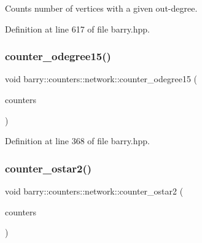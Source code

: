 Counts number of vertices with a given out-\/degree. 



Definition at line 617 of file barry.\+hpp.

\mbox{\label{namespacebarry_1_1counters_1_1network_a7a43854f3227f5f92d3ff580e99c7136}} 
\subsubsection{\texorpdfstring{counter\+\_\+odegree15()}{counter\_odegree15()}}
{\footnotesize\ttfamily void barry\+::counters\+::network\+::counter\+\_\+odegree15 (\begin{DoxyParamCaption}\item[{\hyperlink{namespacebarry_1_1counters_1_1network_a3b3c590303d47840d1967372ae495d95}{Net\+Counter\+Vector} $\ast$}]{counters }\end{DoxyParamCaption})\hspace{0.3cm}{\ttfamily [inline]}}



Definition at line 368 of file barry.\+hpp.

\mbox{\label{namespacebarry_1_1counters_1_1network_af76d9df31e55422bdffdb9e56870a46f}} 
\subsubsection{\texorpdfstring{counter\+\_\+ostar2()}{counter\_ostar2()}}
{\footnotesize\ttfamily void barry\+::counters\+::network\+::counter\+\_\+ostar2 (\begin{DoxyParamCaption}\item[{\hyperlink{namespacebarry_1_1counters_1_1network_a3b3c590303d47840d1967372ae495d95}{Net\+Counter\+Vector} $\ast$}]{counters }\end{DoxyParamCaption})\hspace{0.3cm}{\ttfamily [inline]}}




